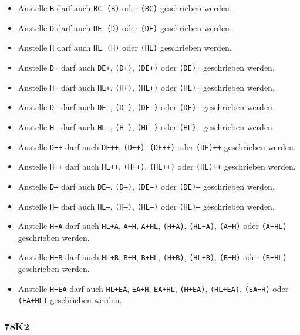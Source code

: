 \documentclass[12pt,a4paper,twoside]{report}
\newcommand{\tty}[1]{{\tt #1}}
\begin{document}
{\begin{itemize}
\item{Anstelle \tty{B} darf auch \tty{BC}, \tty{(B)} oder
      \tty{(BC)} geschrieben werden.}
\item{Anstelle \tty{D} darf auch \tty{DE}, \tty{(D)} oder
      \tty{(DE)} geschrieben werden.}
\item{Anstelle \tty{H} darf auch \tty{HL}, \tty{(H)} oder
      \tty{(HL)} geschrieben werden.}
\item{Anstelle \tty{D+} darf auch \tty{DE+}, \tty{(D+)},
      \tty{(DE+)} oder \tty{(DE)+} geschrieben werden.}
\item{Anstelle \tty{H+} darf auch \tty{HL+}, \tty{(H+)},
      \tty{(HL+)} oder \tty{(HL)+} geschrieben werden.}
\item{Anstelle \tty{D-} darf auch \tty{DE-}, \tty{(D-)},
      \tty{(DE-)} oder \tty{(DE)-} geschrieben werden.}
\item{Anstelle \tty{H-} darf auch \tty{HL-}, \tty{(H-)},
      \tty{(HL-)} oder \tty{(HL)-} geschrieben werden.}
\item{Anstelle \tty{D++} darf auch \tty{DE++}, \tty{(D++)},
      \tty{(DE++)} oder \tty{(DE)++} geschrieben werden.}
\item{Anstelle \tty{H++} darf auch \tty{HL++}, \tty{(H++)},
      \tty{(HL++)} oder \tty{(HL)++} geschrieben werden.}
\item{Anstelle \tty{D--} darf auch \tty{DE--}, \tty{(D--)},
      \tty{(DE--)} oder \tty{(DE)--} geschrieben werden.}
\item{Anstelle \tty{H--} darf auch \tty{HL--}, \tty{(H--)},
      \tty{(HL--)} oder \tty{(HL)--} geschrieben werden.}
\item{Anstelle \tty{H+A} darf auch \tty{HL+A}, \tty{A+H},
      \tty{A+HL}, \tty{(H+A)}, \tty{(HL+A)}, \tty{(A+H)}
      oder \tty{(A+HL)} geschrieben werden.}
\item{Anstelle \tty{H+B} darf auch \tty{HL+B}, \tty{B+H},
      \tty{B+HL}, \tty{(H+B)}, \tty{(HL+B)}, \tty{(B+H)}
      oder \tty{(B+HL)} geschrieben werden.}
\item{Anstelle \tty{H+EA} darf auch \tty{HL+EA}, \tty{EA+H},
      \tty{EA+HL}, \tty{(H+EA)}, \tty{(HL+EA)}, \tty{(EA+H)}
      oder \tty{(EA+HL)} geschrieben werden.}
\end{itemize}


\subsubsection{78K2}

}
\end{document}
